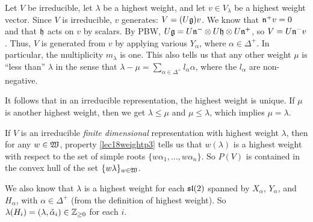  Let $V$ be irreducible, let $\lambda$ be a highest weight, and let $v\in V_\lambda$
 be a highest weight vector. Since $V$ is irreducible, $v$ generates: $V = (U\g)v$.
 We know that $\n^+ v=0$ and that $\h$ acts on $v$ by scalars. By PBW,
 $U\g = U\n^-\otimes U\h\otimes U\n^+$, so $V=U\n^- v$. Thus, $V$ is generated from
 $v$ by applying various $Y_\alpha$, where $\alpha\in \Delta^+$. In particular,
 the multiplicity $m_\lambda$ is one. This also tells us that any other weight $\mu$
 is ``less than'' $\lambda$ in the sense that $\lambda -\mu = \sum_{\alpha\in
 \Delta^+} l_\alpha \alpha$, where the $l_\alpha$ are non-negative.
%

 It follows that in an irreducible representation, the highest weight is unique. If
 $\mu$ is another highest weight, then  we get $\lambda \le \mu$ and $\mu\le \lambda$,
 which implies $\mu = \lambda$.

 \begin{remark}\label{lec18Rmk:finirrep}
   If $V$ is an irreducible \emph{finite dimensional} representation with highest
   weight $\lambda$, then for any $w\in \weyl$, property \ref{lec18weightp3} tells us
   that $w(\lambda)$ is a highest weight with respect to the set of simple roots
   $\{w\alpha_1,\dots, w\alpha_n\}$. So $P(V)$ is contained in the convex hull of the
   set $\{w\lambda\}_{w\in \weyl}$.

   We also know that $\lambda$ is a highest weight for each $\sl(2)$ spanned by
   $X_\alpha$, $Y_\alpha$, and $H_\alpha$, with $\alpha\in \Delta^+$ (from the
   definition of highest weight). So
   $\lambda(H_i)=(\lambda,\check\alpha_i)\in \ZZ_{\ge 0}$ for each $i$.
 \end{remark}

